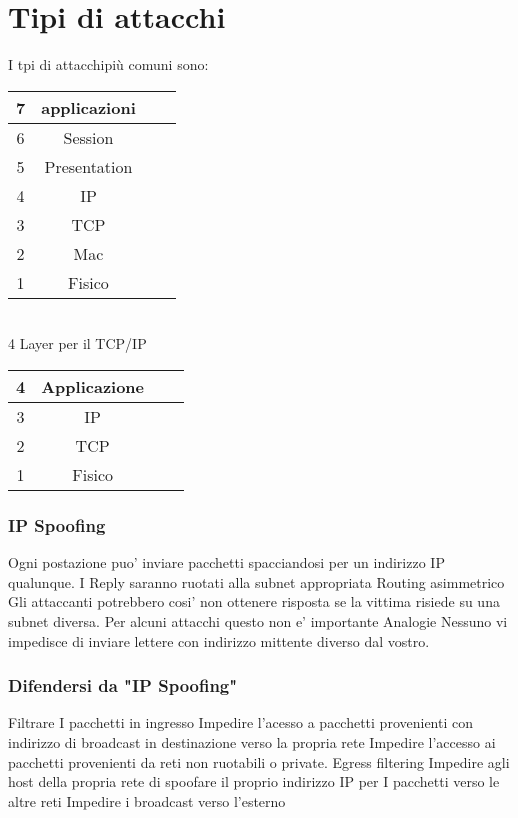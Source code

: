 \chapter{Tipi di attacchi}	 %

I tpi di attacchipiù comuni sono:\\

\begin{tabular}{|c|c|c|c|}
	\hline 
	7& applicazioni &  &  \\ 
	\hline 
	6& Session &  &  \\ 
	\hline 
	5& Presentation &  &  \\ 
	\hline 
	4& IP  &  &  \\ 
	\hline 
	3& TCP &  &  \\ 
	\hline 
	2&  Mac&  &  \\ 
	\hline 
	1& Fisico &  &  \\ 
	\hline 
\end{tabular} \\

4 Layer per il TCP/IP \\

\begin{tabular}{|c|c|c|c|}
	\hline 
	4& Applicazione &  &  \\ 
	\hline 
	3& IP &  &  \\ 
	\hline 
	2&  TCP&  &  \\ 
	\hline 
	1& Fisico &  &  \\ 
	\hline 
\end{tabular} 
\subsection{IP Spoofing}

Ogni postazione puo’ inviare pacchetti spacciandosi per un indirizzo IP qualunque.
 I Reply saranno ruotati alla subnet appropriata
 Routing asimmetrico
 Gli attaccanti potrebbero cosi’ non ottenere risposta se la vittima risiede su una subnet diversa.
Per alcuni attacchi questo non e’ importante
 Analogie
 Nessuno vi impedisce di inviare lettere con indirizzo mittente diverso dal vostro.
 
 \subsection{Difendersi da "IP Spoofing"}
 
 Filtrare I pacchetti in ingresso
 Impedire l’acesso a pacchetti provenienti con indirizzo di broadcast in destinazione verso la propria rete
 Impedire l’accesso ai pacchetti provenienti da reti non ruotabili o private.
Egress filtering
 Impedire agli host della propria rete di spoofare il proprio indirizzo IP per I pacchetti verso le altre reti
Impedire i broadcast verso l’esterno